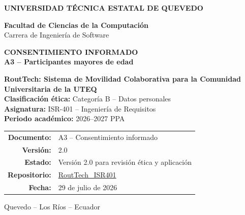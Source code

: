 \documentclass[10pt,a4paper]{article}
\newcommand{\Proyecto}{RoutTech: Sistema de Movilidad Colaborativa para la Comunidad Universitaria de la UTEQ}
\newcommand{\Asignatura}{ISR-401 -- Ingeniería de Requisitos}
\newcommand{\Periodo}{2026--2027 PPA}
\newcommand{\CategoriaEtica}{Categoría B -- Datos personales}
\newcommand{\Repositorio}{https://github.com/AnderJM3/RoutTech_ISR401}
\newcommand{\FechaDocumento}{29 de julio de 2026}
\newcommand{\VersionDocumento}{2.0}
\newcommand{\EstadoDocumento}{Versión 2.0 para revisión ética y aplicación}
\begin{document}
\justifying

\thispagestyle{empty}

\vspace*{0.65cm}
\begin{center}
{\color{white}\Large\bfseries UNIVERSIDAD TÉCNICA ESTATAL DE QUEVEDO}

\vspace{1.75cm}
{\large\bfseries\color{RTForest} Facultad de Ciencias de la Computación\\[4pt]}
{\normalsize\color{RTGray} Carrera de Ingeniería de Software}

\vspace{0.8cm}

{\Huge\bfseries\color{RTForest} CONSENTIMIENTO INFORMADO\\[8pt]}
{\Large\bfseries\color{RTTerracotta} A3 -- Participantes mayores de edad}

\vspace{1.0cm}

\begin{tcolorbox}[width=0.90\textwidth,colback=RTCream,colframe=RTGold,boxrule=1pt,arc=2mm]
\centering
{\large\bfseries \Proyecto}\\[7pt]
\textbf{Clasificación ética:} \CategoriaEtica\\
\textbf{Asignatura:} \Asignatura\\
\textbf{Periodo académico:} \Periodo
\end{tcolorbox}

\vfill
\begin{tabular}{rl}
\textbf{Documento:} & A3 -- Consentimiento informado\\
\textbf{Versión:} & \VersionDocumento\\
\textbf{Estado:} & \EstadoDocumento\\
\textbf{Repositorio:} & \href{\Repositorio}{RoutTech\_ISR401}\\
\textbf{Fecha:} & \FechaDocumento
\end{tabular}

\vspace{0.75cm}
{\small Quevedo -- Los Ríos -- Ecuador}
\end{center}
\clearpage
\end{document}
